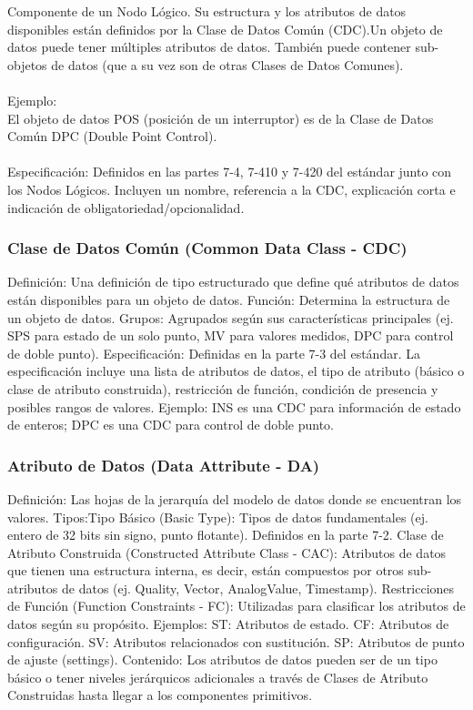 \documentclass[a5paper]{book}%
\begin{document}
Componente de un Nodo Lógico. Su estructura y los atributos de datos disponibles están definidos por la Clase de Datos Común (CDC).Un objeto de datos puede tener múltiples atributos de datos. También puede contener sub-objetos de datos (que a su vez son de otras Clases de Datos Comunes).\\\\
Ejemplo:\\
El objeto de datos POS (posición de un interruptor) es de la Clase de Datos Común DPC (Double Point Control).\\\\
    Especificación: Definidos en las partes 7-4, 7-410 y 7-420 del estándar junto con los Nodos Lógicos. Incluyen un nombre, referencia a la CDC, explicación corta e indicación de obligatoriedad/opcionalidad.

\subsubsection{Clase de Datos Común (Common Data Class - CDC)}

    Definición: Una definición de tipo estructurado que define qué atributos de datos están disponibles para un objeto de datos.
    Función: Determina la estructura de un objeto de datos.
    Grupos: Agrupados según sus características principales (ej. SPS para estado de un solo punto, MV para valores medidos, DPC para control de doble punto).
    Especificación: Definidas en la parte 7-3 del estándar. La especificación incluye una lista de atributos de datos, el tipo de atributo (básico o clase de atributo construida), restricción de función, condición de presencia y posibles rangos de valores.
    Ejemplo: INS es una CDC para información de estado de enteros; DPC es una CDC para control de doble punto.

\subsubsection{Atributo de Datos (Data Attribute - DA)}

    Definición: Las hojas de la jerarquía del modelo de datos donde se encuentran los valores.
    Tipos:Tipo Básico (Basic Type): Tipos de datos fundamentales (ej. entero de 32 bits sin signo, punto flotante). Definidos en la parte 7-2.
    Clase de Atributo Construida (Constructed Attribute Class - CAC): Atributos de datos que tienen una estructura interna, es decir, están compuestos por otros sub-atributos de datos (ej. Quality, Vector, AnalogValue, Timestamp).
    Restricciones de Función (Function Constraints - FC): Utilizadas para clasificar los atributos de datos según su propósito. Ejemplos:
    ST: Atributos de estado.
    CF: Atributos de configuración.
    SV: Atributos relacionados con sustitución.
    SP: Atributos de punto de ajuste (settings).
    Contenido: Los atributos de datos pueden ser de un tipo básico o tener niveles jerárquicos adicionales a través de Clases de Atributo Construidas hasta llegar a los componentes primitivos.
\end{document}
